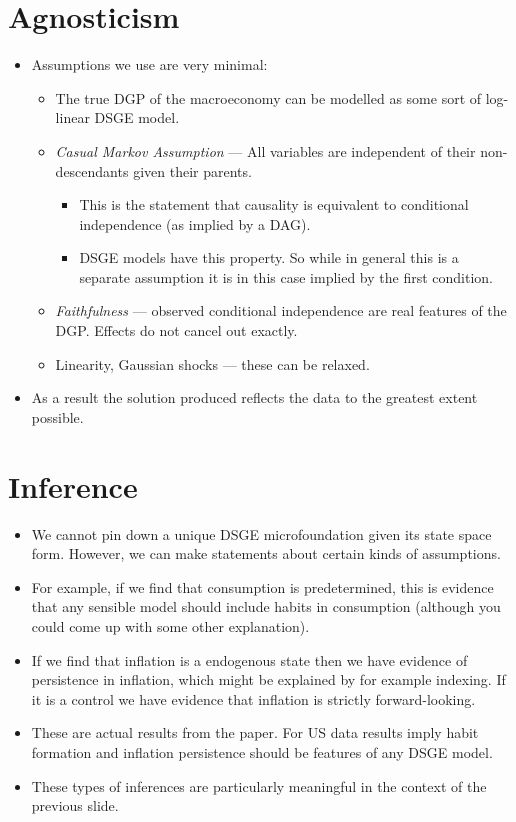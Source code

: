 \documentclass{article}
\begin{document}
\section*{Agnosticism}
\begin{itemize}
    \item Assumptions we use are very minimal:
    \begin{itemize}
        \item The true DGP of the macroeconomy can be modelled as some sort of log-linear DSGE model.
        \item \textit{Casual Markov Assumption} --- All variables are independent of their non-descendants given their parents.
        \begin{itemize}
            \item This is the statement that causality is equivalent to conditional independence (as implied by a DAG).
            \item DSGE models have this property. So while in general this is a separate assumption it is in this case implied by the first condition.
        \end{itemize}
        \item \textit{Faithfulness} --- observed conditional independence are real features of the DGP. Effects do not cancel out exactly.
        \item Linearity, Gaussian shocks --- these can be relaxed.
    \end{itemize}
    \item As a result the solution produced reflects the data to the greatest extent possible.
\end{itemize}

\section*{Inference}
\begin{itemize}
    \item We cannot pin down a unique DSGE microfoundation given its state space form. However, we can make statements about certain kinds of assumptions.
    \item For example, if we find that consumption is predetermined, this is evidence that any sensible model should include habits in consumption (although you could come up with some other explanation).
    \item If we find that inflation is a endogenous state then we have evidence of persistence in inflation, which might be explained by for example indexing. If it is a control we have evidence that inflation is strictly forward-looking.
    \item These are actual results from the paper. For US data results imply habit formation and inflation persistence should be features of any DSGE model.
    \item These types of inferences are particularly meaningful in the context of the previous slide.
\end{itemize}
\end{document}
